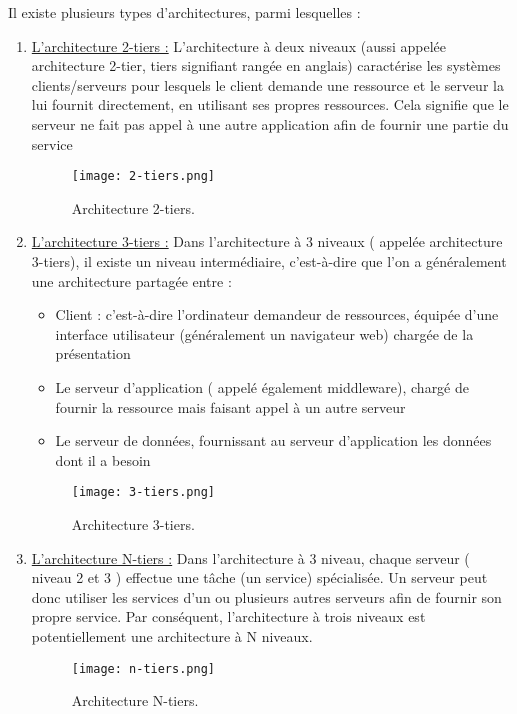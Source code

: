 Il existe plusieurs types d’architectures, parmi lesquelles :
\begin{enumerate}
	\item  \underline{L'architecture 2-tiers :}
	L’architecture à deux niveaux (aussi appelée architecture 2-tier, tiers signifiant rangée en anglais) caractérise les systèmes clients/serveurs pour lesquels le client demande une ressource et le serveur la lui fournit directement, en utilisant ses propres ressources. Cela signifie que le serveur ne fait pas appel à une autre application afin de fournir une partie du service
	\begin{figure}[H]
	\centering
	\texttt{[image: 2-tiers.png]}
	\caption{Architecture 2-tiers.}
	\label{fig:sp0}
\end{figure}


\item  \underline{L'architecture 3-tiers :}
	Dans l’architecture à 3 niveaux ( appelée architecture 3-tiers), il existe un niveau intermédiaire, c’est-à-dire que l’on a généralement une architecture partagée entre :
	
	\begin{itemize}[label=\textbullet, font=\LARGE \color{blue}] 
	\item  Client : c’est-à-dire l’ordinateur demandeur de ressources, équipée d’une interface utilisateur (généralement un navigateur web) chargée de la présentation
	\item  Le serveur d’application ( appelé également middleware), chargé de fournir la ressource mais faisant appel à un autre serveur
	\item  Le serveur de données, fournissant au serveur d’application les données dont il a besoin 
\end{itemize}

	\begin{figure}[H]
	\centering
	\texttt{[image: 3-tiers.png]}
	\caption{Architecture 3-tiers.}
	\label{fig:sp0}
\end{figure}


\item  \underline{L'architecture N-tiers :}
	Dans l’architecture à 3 niveau, chaque serveur ( niveau 2 et 3 ) effectue une tâche (un service) spécialisée. Un serveur peut donc utiliser les services d’un ou plusieurs autres serveurs afin de fournir son propre service. Par conséquent, l’architecture à trois niveaux est potentiellement une architecture à N niveaux.
	
	\begin{figure}[H]
	\centering
	\texttt{[image: n-tiers.png]}
	\caption{Architecture N-tiers.}
	\label{fig:sp0}
\end{figure}
\end{enumerate}

